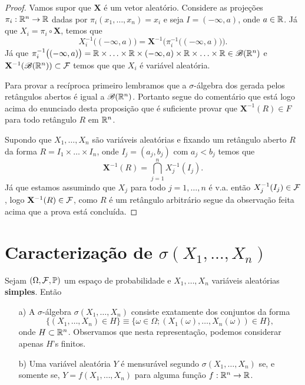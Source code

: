 \begin{proof}
Vamos supor que $\mathbf{X}$ é um vetor aleatório.
Considere as projeções $\pi_i:\mathbb{R}^n\to \mathbb{R}$ dadas por 
$\pi_i(x_1,\ldots,x_n)=x_i$ e seja $I=(-\infty,a)$,
onde $a\in\mathbb{R}$. Já que $X_i = \pi_i\circ \mathbf{X}$,
temos que 
\[
	X_i^{-1}\big((-\infty,a)\big) 
	= 
	\mathbf{X}^{-1}\Big( \pi_i^{-1}\big( (-\infty,a)\big)\Big).
\]
Já que 
$\pi_i^{-1}\big( (-\infty,a)\big)
 = 
 \mathbb{R}\times\ldots\times\mathbb{R}\times (-\infty,a)\times\mathbb{R}\times\ldots\times\mathbb{R}
 \in
 \mathscr{B}(\mathbb{R}^n)
$
e $\mathbf{X}^{-1}(\mathscr{B}(\mathbb{R}^n))\subset \mathcal{F}$ temos que 
que $X_i$ é variável aleatória.

Para provar a recíproca primeiro lembramos que
a $\sigma$-álgebra dos gerada pelos 
retângulos abertos é igual a $\mathscr{B}(\mathbb{R}^n)$. Portanto 
segue do comentário que está logo acima do enunciado
desta proposição que é suficiente provar que 
$\mathbf{X}^{-1}(R)\in F$ para todo retângulo $R$ em 
$\mathbb{R}^n$. 

Supondo que $X_1,\ldots,X_n$ são variáveis aleatórias e 
fixando um retângulo aberto $R$ da forma 
$R=I_1\times\ldots\times I_n$, onde $I_j=(a_j,b_j)$ com $a_j<b_j$
temos que 
	\[
	\mathbf{X}^{-1}(R) 
	= 
	\bigcap_{j=1}^n X_j^{-1}(I_j).
	\]	
Já que estamos assumindo que 
$X_j$ para todo $j=1,\ldots,n$ é v.a.
então $X_j^{-1}(I_j)\in \mathcal{F}$, logo $\mathbf{X}^{-1}(R)\in \mathcal{F}$,
como $R$ é um retângulo arbitrário segue da observação feita 
acima que a prova está concluída.
\end{proof}











\section{Caracterização de $\sigma(X_1,\ldots,X_n)$}





\begin{teorema}
Sejam $(\Omega,\mathcal{F},\mathbb{P})$ um espaço de probabilidade
e $X_1,\ldots,X_n$ variáveis aleatórias {\bf simples}. Então
\begin{itemize}
	\item[a)]
	A $\sigma$-álgebra $\sigma(X_1,\ldots,X_n)$ 
	consiste exatamente dos conjuntos da forma
	\[
		\{(X_1,\ldots,X_n)\in H\} 
		\equiv
		\{\omega\in\Omega; (X_1(\omega),\ldots,X_n(\omega))\in H\},
	\]
	onde $H\subset \mathbb{R}^n$. 
	Observamos que nesta representação, 
	podemos considerar apenas $H$'s finitos.
	
	\item[b)]
	Uma variável aleatória $Y$ é mensurável segundo 
	$\sigma(X_1,\ldots,X_n)$ se, e somente se,
	$Y=f(X_1,\ldots,X_n)$ para alguma função 
	$f:\mathbb{R}^n\to\mathbb{R}$.	
\end{itemize}
\end{teorema}


